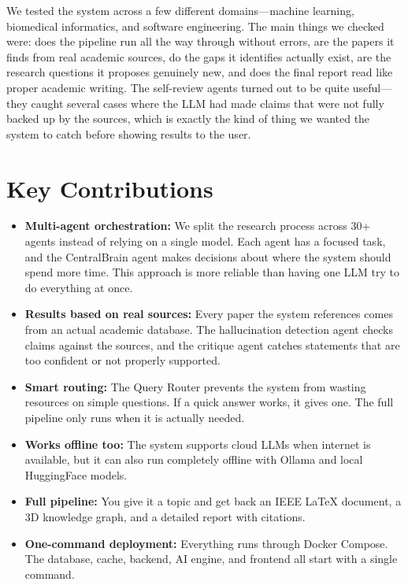\documentclass[12pt,a4paper]{article}
\begin{document}
We tested the system across a few different domains---machine learning, biomedical informatics, and software engineering. The main things we checked were: does the pipeline run all the way through without errors, are the papers it finds from real academic sources, do the gaps it identifies actually exist, are the research questions it proposes genuinely new, and does the final report read like proper academic writing. The self-review agents turned out to be quite useful---they caught several cases where the LLM had made claims that were not fully backed up by the sources, which is exactly the kind of thing we wanted the system to catch before showing results to the user.

\section{Key Contributions}

\begin{itemize}[leftmargin=*, itemsep=2pt, topsep=2pt]
  \item \textbf{Multi-agent orchestration:} We split the research process across 30+ agents instead of relying on a single model. Each agent has a focused task, and the CentralBrain agent makes decisions about where the system should spend more time. This approach is more reliable than having one LLM try to do everything at once.
  \item \textbf{Results based on real sources:} Every paper the system references comes from an actual academic database. The hallucination detection agent checks claims against the sources, and the critique agent catches statements that are too confident or not properly supported.
  \item \textbf{Smart routing:} The Query Router prevents the system from wasting resources on simple questions. If a quick answer works, it gives one. The full pipeline only runs when it is actually needed.
  \item \textbf{Works offline too:} The system supports cloud LLMs when internet is available, but it can also run completely offline with Ollama and local HuggingFace models.
  \item \textbf{Full pipeline:} You give it a topic and get back an IEEE LaTeX document, a 3D knowledge graph, and a detailed report with citations.
  \item \textbf{One-command deployment:} Everything runs through Docker Compose. The database, cache, backend, AI engine, and frontend all start with a single command.
\end{itemize}
\end{document}
